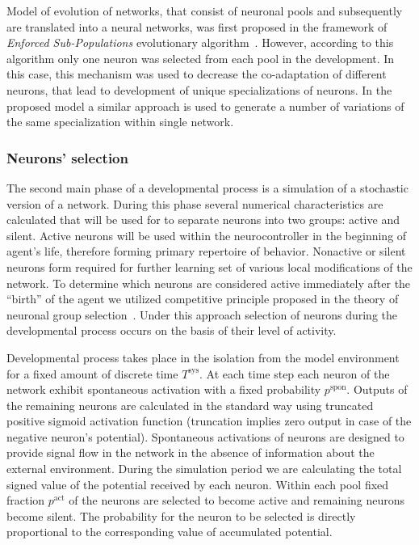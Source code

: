\documentclass[letterpaper]{article}
\begin{document}
Model of evolution of networks, that consist of neuronal pools and subsequently are translated into a neural networks, was first proposed in the framework of {\em Enforced Sub-Populations} evolutionary algorithm~\citep{GomezMiikkulainen1999}. However, according to this algorithm only one neuron was selected from each pool in the development.  In this case, this mechanism was used to decrease the co-adaptation of different neurons, that lead to development of unique specializations of neurons. In the proposed model a similar approach is used to generate a number of variations of the same specialization within single network.

\subsubsection{Neurons' selection} The second main phase of a developmental process is a simulation of a stochastic version of a network. During this phase several numerical characteristics are calculated that will be used for to separate neurons into two groups: active and silent. Active neurons will be used within the neurocontroller in the beginning of agent's life, therefore forming primary repertoire of behavior. Nonactive or silent neurons form required for further learning set of various local modifications of the network. To determine which neurons are considered active immediately after the ``birth'' of the agent we utilized competitive principle proposed in the theory of neuronal group selection~\citep{Edelman1993}. Under this approach selection of neurons during the developmental process occurs on the basis of their level of activity. 

Developmental process takes place in the isolation from the model environment for a fixed amount of discrete time $T^{\mathrm{sys}}$. At each time step each neuron of the network exhibit spontaneous activation with a fixed probability $p^{\mathrm{spon}}$. Outputs of the remaining neurons are calculated in the standard way using truncated positive sigmoid activation function (truncation implies zero output in case of the negative neuron's potential). Spontaneous activations of neurons are designed to provide signal flow in the network in the absence of information about the external environment. During the simulation period we are calculating the total signed value of the potential received by each neuron. Within each pool fixed fraction $p^{\mathrm{act}}$ of the neurons are selected to become active and remaining neurons become silent. The probability for the neuron to be selected is directly proportional to the corresponding value of accumulated potential.
\end{document}
